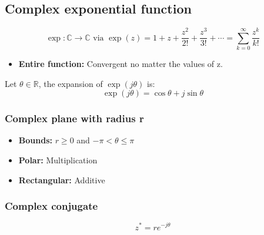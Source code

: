 \subsection{Complex exponential function}
\begin{definition}
    \begin{equation}
        \exp: \mathbb{C} \to \mathbb{C} \text{ via } \exp(z) = 1 + z + \frac{z^2}{2!} + \frac{z^3}{3!} + \cdots = \sum_{k=0}^{\infty} \frac{z^k}{k!}    
    \end{equation}
    \begin{itemize}
        \item \textbf{Entire function:} Convergent no matter the values of z.
    \end{itemize}
    
    Let \( \theta \in \mathbb{R} \), the expansion of \( \exp(j\theta) \) is:
    \begin{equation}
        \exp(j\theta) = \cos \theta + j \sin \theta 
    \end{equation}
\end{definition}

    \subsubsection{Complex plane with radius r}
    \begin{intuition}

        \begin{itemize}
            \item \textbf{Bounds:} $r \geq 0$ and $-\pi < \theta \leq \pi$
            \item \textbf{Polar:} Multiplication
            \item \textbf{Rectangular:} Additive
        \end{itemize}
    \end{intuition}

    \subsubsection{Complex conjugate}
    \begin{definition}
        \begin{equation}
            z^* = re^{-j\theta}
        \end{equation}
    \end{definition}

